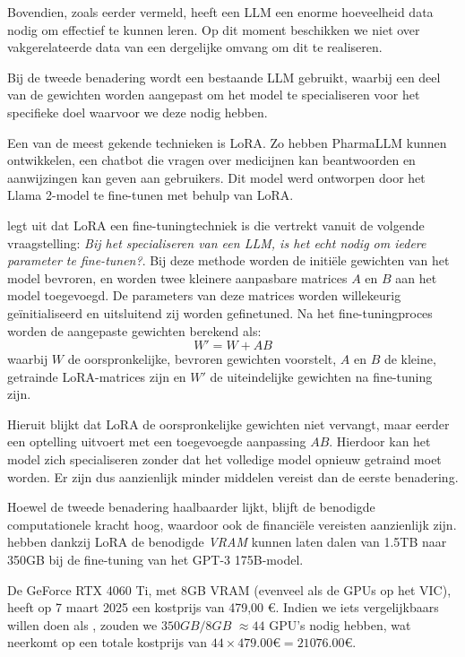 Bovendien, zoals eerder vermeld, heeft een \acrshort{LLM} een enorme hoeveelheid data nodig om effectief te kunnen leren. Op dit moment beschikken we niet over vakgerelateerde data van een dergelijke omvang om dit te realiseren.

Bij de tweede benadering wordt een bestaande \acrshort{LLM} gebruikt, waarbij een deel van de gewichten worden aangepast om het model te specialiseren voor het specifieke doel waarvoor we deze nodig hebben.

Een van de meest gekende technieken is \acrfull{LoRA}. Zo hebben \textcite{Azam2024} PharmaLLM kunnen ontwikkelen, een chatbot die vragen over medicijnen kan beantwoorden en aanwijzingen kan geven aan gebruikers. Dit model werd ontworpen door het Llama 2-model te fine-tunen met behulp van \acrshort{LoRA}. 

\textcite{Hu2024} legt uit dat \acrshort{LoRA} een fine-tuningtechniek is die vertrekt vanuit de volgende vraagstelling: \emph{Bij het specialiseren van een \acrshort{LLM}, is het echt nodig om iedere parameter te fine-tunen?}. Bij deze methode worden de initiële gewichten van het model bevroren, en worden twee kleinere aanpasbare matrices $A$ en $B$ aan het model toegevoegd. De parameters van deze matrices worden willekeurig geïnitialiseerd en uitsluitend zij worden gefinetuned. Na het fine-tuningproces worden de aangepaste gewichten berekend als: \[W' = W + AB\] waarbij $W$ de oorspronkelijke, bevroren gewichten voorstelt, $A$ en $B$ de kleine, getrainde LoRA-matrices zijn en $W'$ de uiteindelijke gewichten na fine-tuning zijn. 

Hieruit blijkt dat \acrshort{LoRA} de oorspronkelijke gewichten niet vervangt, maar eerder een optelling uitvoert met een toegevoegde aanpassing $AB$. Hierdoor kan het model zich specialiseren zonder dat het volledige model opnieuw getraind moet worden. Er zijn dus aanzienlijk minder middelen vereist dan de eerste benadering.

Hoewel de tweede benadering haalbaarder lijkt, blijft de benodigde computationele kracht hoog, waardoor ook de financiële vereisten aanzienlijk zijn. \textcite{Hu2021} hebben dankzij \acrshort{LoRA} de benodigde \emph{VRAM} kunnen laten dalen van 1.5TB naar 350GB bij de fine-tuning van het GPT-3 175B-model.

De GeForce RTX 4060 Ti, met 8GB VRAM (evenveel als de GPUs op het VIC), heeft op 7 maart 2025 een kostprijs van 479,00 €. Indien we iets vergelijkbaars willen doen als \textcite{Hu2021}, zouden we $350GB / 8GB$ $\approx 44$ GPU's nodig hebben, wat neerkomt op een totale kostprijs van $44 \times 479.00 € = 21 076.00 €$.

